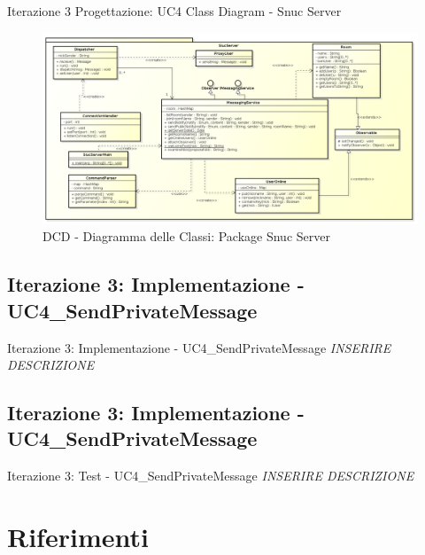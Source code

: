 \documentclass[t]{beamer} %
\begin{document}
\begin{frame} {Iterazione 3 Progettazione: UC4 Class Diagram - Snuc Server}
   \begin{figure}
     \includegraphics[scale=0.245]{image_astah/Iteration_3_DesignModel/ClassDiagramSnucServer.png}{\centering}
     \caption{DCD - Diagramma delle Classi: Package Snuc Server }
     \label{fig_UC4_DCD_2} 
   \end{figure}
\end{frame}

\subsection {Iterazione 3: Implementazione - UC4\_SendPrivateMessage}
\begin{frame} {Iterazione 3: Implementazione - UC4\_SendPrivateMessage}
 \emph{INSERIRE DESCRIZIONE}
\end{frame}

\subsection {Iterazione 3: Implementazione - UC4\_SendPrivateMessage}
\begin{frame} {Iterazione 3: Test - UC4\_SendPrivateMessage}
 \emph{INSERIRE DESCRIZIONE}
\end{frame}

\section {Riferimenti}
\end{document}
